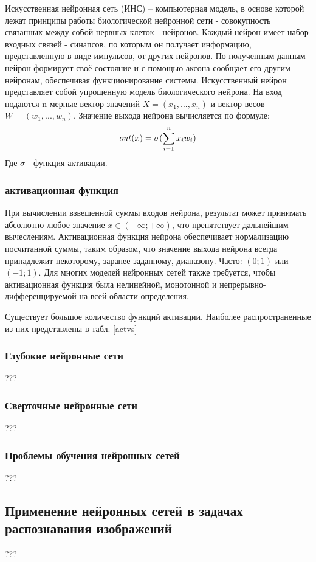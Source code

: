 Искусственная нейронная сеть (ИНС) – компьютерная модель, в основе которой лежат принципы работы биологической нейронной сети - совокупность связанных между собой нервных клеток - нейронов. Каждый нейрон имеет набор входных связей - синапсов, по которым он получает информацию, представленную в виде импульсов, от других нейронов. По полученным данным нейрон формирует своё состояние и с помощью аксона сообщает его другим нейронам, обеспечивая функционирование системы. 
Искусственный нейрон представляет собой упрощенную модель биологического нейрона. На вход подаются n-мерные вектор значений $X=(x_{1},...,x_{n})$ и вектор весов $W=(w_{1},...,w_{n})$. Значение выхода нейрона вычисляется по формуле: 
\[
  out(x)=\sigma(\sum_{\mathclap{i=1}}^{n} x_{i}w_{i})
\]
Где $\sigma$ - функция активации.

\subsubsection{активационная функция}
При вычислении взвешенной суммы входов нейрона, результат может принимать абсолютно любое значение $x\in(-\infty;+\infty)$, что препятствует дальнейшим вычеслениям.
Активационная функция нейрона обеспечивает нормализацию посчитанной суммы, таким образом, что значение выхода нейрона всегда принадлежит некоторому, заранее заданному, диапазону. Часто: $(0;1)$ или $(-1;1)$. Для многих моделей нейронных сетей также требуется, чтобы активационная функция была нелинейной, монотонной и непрерывно-дифференцируемой на всей области определения.

Существует большое количество функций активации. Наиболее распространенные из них представлены в табл. \ref{actvs}




\subsubsection{Глубокие нейронные сети}
???
\subsubsection{Сверточные нейронные сети}
???
\subsubsection{Проблемы обучения нейронных сетей}
???
\subsection{Применение нейронных сетей в задачах распознавания изображений}
???
\clearpage
